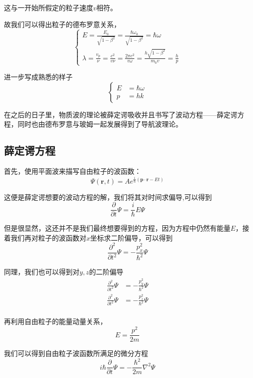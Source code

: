 \documentclass{article}
\newcommand{\Da}[2]{\frac{\partial}{\partial#2}#1}
\begin{document}
这与一开始所假定的粒子速度$v$相符。

故我们可以得出粒子的德布罗意关系，
\begin{equation*}
	\begin{cases}
		E = \frac{E_0}{\sqrt{1-\beta^2}} = \frac{\hbar\omega_0}{\sqrt{1-\beta^2}} = \hbar\omega \\
		\lambda = \frac{v_p}{\nu}=\frac{c^2}{v\nu}=\frac{2\pi c^2}{v\omega}=\frac{h\sqrt{1-\beta^2}}{m_0v}=\frac{h}{p}
	\end{cases}
\end{equation*}

进一步写成熟悉的样子
\begin{equation*}
	\begin{cases}
		E & =\hbar\omega \\
		p & =hk
	\end{cases}
\end{equation*}


在之后的日子里，物质波的理论被薛定谔吸收并且书写了波动方程——薛定谔方程，同时也由德布罗意与玻姆一起发展得到了导航波理论。

\subsection{薛定谔方程}
首先，使用平面波来描写自由粒子的波函数：
\[
	\Psi(\textbf{r},t)=Ae^{\frac{i}{\hbar}(\textbf{p}\cdot\textbf{r}-Et)}
\]

这便是薛定谔想要的波动方程的解，我们将其对时间求偏导,可以得到
\[\frac{\partial }{\partial t}\Psi=\frac{i}{\hbar}E\Psi\]

但是很显然，这还并不是我们最终想要得到的方程，因为方程中仍然有能量$E$，接着我们再对粒子的波函数对$x$坐标求二阶偏导，可以得到
\[\frac{\partial^2}{\partial t^2}\Psi=-\frac{p_x^2}{\hbar^2}\Psi\]

同理，我们也可以得到对$y,z$的二阶偏导
\begin{align*}
	\frac{\partial^2}{\partial t^2}\Psi & =-\frac{p_y^2}{\hbar^2}\Psi \\
	\frac{\partial^2}{\partial t^2}\Psi & =-\frac{p_z^2}{\hbar^2}\Psi \\
\end{align*}

再利用自由粒子的能量动量关系，
\[E=\frac{p^2}{2m}\]

我们可以得到自由粒子波函数所满足的微分方程
\begin{equation}
	i\hbar\Da{\Psi}{t}=-\frac{\hbar^2}{2m}\nabla^2\Psi
\end{equation}
\end{document}
